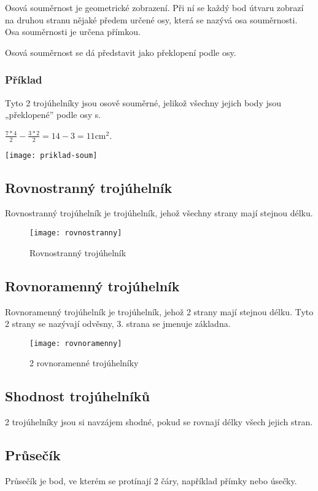Osová souměrnost je geometrické zobrazení. Při ní se každý bod útvaru zobrazí na druhou stranu nějaké předem určené osy, která se nazývá osa souměrnosti. Osa souměrnosti je určena přímkou.

Osová souměrnost se dá představit jako překlopení podle osy.

\subsubsection{Příklad}
\begin{minipage}[t]{\linewidth}
	Tyto 2 trojúhelníky jsou osově souměrné, jelikož všechny jejich body jsou „překlopené” podle osy s.
	
	$ \frac{7*4}{2} - \frac{3*2}{2} =  14 - 3 = 11 \text{cm}^{2}$.
	\begin{center}
		\texttt{[image: priklad-soum]}
	\end{center}
\end{minipage}

\subsection{Rovnostranný trojúhelník}
Rovnostranný trojúhelník je trojúhelník, jehož všechny strany mají stejnou délku.

\begin{figure}[h]
	\caption{Rovnostranný trojúhelník}
	\centering
	\texttt{[image: rovnostranny]}
\end{figure}

\subsection{Rovnoramenný trojúhelník}
Rovnoramenný trojúhelník je trojúhelník, jehož 2 strany mají stejnou délku. Tyto 2 strany se nazývají odvěsny, 3. strana se jmenuje základna.

\begin{figure}[h]
	\caption{2 rovnoramenné trojúhelníky}
	\centering
	\texttt{[image: rovnoramenny]}
\end{figure}


\subsection{Shodnost trojúhelníků}
2 trojúhelníky jsou si navzájem shodné, pokud se rovnají délky všech jejich stran.

\subsection{Průsečík}
Průsečík je bod, ve kterém se protínají 2 čáry, například přímky nebo úsečky.

